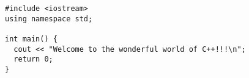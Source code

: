 \documentclass{article}
\begin{document}
\begin{lstlisting}[caption={test algorithm}]
#include <iostream>
using namespace std;

int main() {
  cout << "Welcome to the wonderful world of C++!!!\n";
  return 0;
}
\end{lstlisting}
\end{document}
